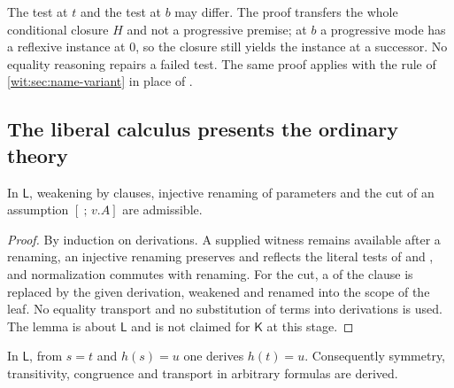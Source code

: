 \begin{remark}
\label{wit:rem:mode}
The test at $t$ and the test at $b$ may differ.  The proof transfers the
whole conditional closure $H$ and not a progressive premise; at $b$ a
progressive mode has a reflexive instance at $0$, so the closure still
yields the instance at a successor.  No equality reasoning repairs a failed
test.  The same proof applies with the rule  of
\cref{wit:sec:name-variant} in place of .
\end{remark}

\subsection{The liberal calculus presents the ordinary theory}
\label{wit:sec:liberal}

\begin{lemma}
\label{wit:lem:liberal-structural}
In $\mathsf{L}$, weakening by clauses, injective renaming of parameters and
the cut of an assumption $[\ ;\,v.A]$ are admissible.
\end{lemma}

\begin{proof}
By induction on derivations.  A supplied witness remains available after a
renaming, an injective renaming preserves and reflects the literal tests of
 and , and normalization commutes with
renaming.  For the cut, a  of the clause is replaced by the
given derivation, weakened and renamed into the scope of the leaf.  No
equality transport and no substitution of terms into derivations is used.
The lemma is about $\mathsf{L}$ and is not claimed for $\mathsf{K}$ at this
stage.
\end{proof}

\begin{lemma}
\label{wit:lem:liberal-transport}
In $\mathsf{L}$, from $s=t$ and $h(s)=u$ one derives $h(t)=u$.
Consequently symmetry, transitivity, congruence and transport in arbitrary
formulas are derived.
\end{lemma}

